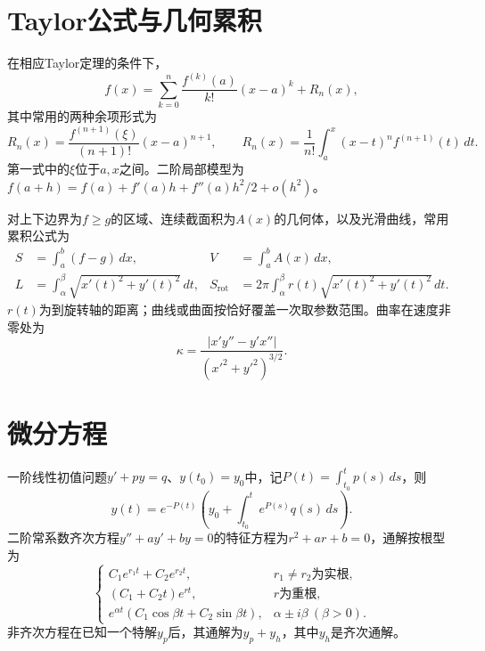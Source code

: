 \section{Taylor公式与几何累积}

在相应Taylor定理的条件下，
\begin{equation*}
 f(x)=\sum_{k=0}^n\frac{f^{(k)}(a)}{k!}(x-a)^k+R_n(x),
\end{equation*}
其中常用的两种余项形式为
\begin{equation*}
 R_n(x)=\frac{f^{(n+1)}(\xi)}{(n+1)!}(x-a)^{n+1},\qquad
 R_n(x)=\frac1{n!}\int_a^x(x-t)^n f^{(n+1)}(t)\,dt.
\end{equation*}
第一式中的\(\xi\)位于\(a,x\)之间。二阶局部模型为\(f(a+h)=f(a)+f'(a)h+f''(a)h^2/2+o(h^2)\)。

对上下边界为\(f\ge g\)的区域、连续截面积为\(A(x)\)的几何体，以及光滑曲线，常用累积公式为
\begin{equation*}
 \begin{aligned}
 S&=\int_a^b(f-g)\,dx,&
 V&=\int_a^b A(x)\,dx,\\
 L&=\int_\alpha^\beta\sqrt{x'(t)^2+y'(t)^2}\,dt,&
 S_{\mathrm{rot}}&=2\pi\int_\alpha^\beta r(t)\sqrt{x'(t)^2+y'(t)^2}\,dt.
 \end{aligned}
\end{equation*}
\(r(t)\)为到旋转轴的距离；曲线或曲面按恰好覆盖一次取参数范围。曲率在速度非零处为
\begin{equation*}
 \kappa=\frac{|x'y''-y'x''|}{(x'^2+y'^2)^{3/2}}.
\end{equation*}

\section{微分方程}

一阶线性初值问题\(y'+py=q\)、\(y(t_0)=y_0\)中，记\(P(t)=\int_{t_0}^tp(s)\,ds\)，则
\begin{equation*}
 y(t)=e^{-P(t)}\left(y_0+\int_{t_0}^t e^{P(s)}q(s)\,ds\right).
\end{equation*}
二阶常系数齐次方程\(y''+ay'+by=0\)的特征方程为\(r^2+ar+b=0\)，通解按根型为
\begin{equation*}
 \begin{cases}
 C_1e^{r_1t}+C_2e^{r_2t},&r_1\ne r_2\text{为实根},\\
 (C_1+C_2t)e^{rt},&r\text{为重根},\\
 e^{\alpha t}(C_1\cos\beta t+C_2\sin\beta t),&\alpha\pm i\beta\ (\beta>0).
 \end{cases}
\end{equation*}
非齐次方程在已知一个特解\(y_p\)后，其通解为\(y_p+y_h\)，其中\(y_h\)是齐次通解。
\endgroup
